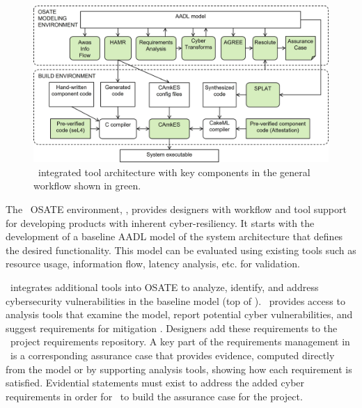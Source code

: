 \begin{figure}
	\begin{center}
	  \includegraphics[width=\textwidth]{./figs/tool-arch.jpg}
  	\end{center}
	\caption{\brfcs\ integrated tool architecture with key components in the general workflow shown in green.} 
	\label{fig:tool-arch} 
\end{figure}

The \brfcs\ OSATE environment, , provides designers with workflow and tool support for developing products with inherent cyber-resiliency.
It starts with the development of a baseline AADL model of the system architecture that defines the desired functionality.
This model can be evaluated using existing tools such as resource usage, information flow, latency analysis, etc. for validation.

\brfcs\ integrates additional tools into OSATE to analyze, identify, and address cybersecurity vulnerabilities in the baseline model (top of ).
\brfcs\ provides access to analysis tools that examine the model, report potential cyber vulnerabilities,
and suggest requirements for mitigation \cite{dcrypps2019,gearcase2020}.
Designers add these requirements to the \brfcs\ project requirements repository. 
A key part of the requirements management in \brfcs\ is a corresponding assurance case that provides evidence, computed directly from the model or by supporting analysis tools, showing how each requirement is satisfied.
Evidential statements must exist to address the added cyber requirements in order for \brfcs\ to build the assurance case for the project.

